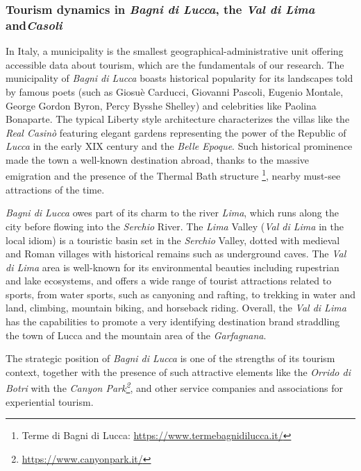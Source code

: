 \documentclass[sustainability,article,submit,pdftex,moreauthors]{Definitions/mdpi}
\begin{document}

\subsubsection{Tourism dynamics in \emph{Bagni di Lucca}, the \emph{Val di Lima} and\emph{Casoli}}

In Italy, a municipality is the smallest geographical-administrative unit offering accessible data about tourism, which are the fundamentals of our research. The municipality of \emph{Bagni di Lucca} boasts historical popularity for its landscapes told by famous poets (such as Giosuè Carducci, Giovanni Pascoli, Eugenio Montale, George Gordon Byron, Percy Bysshe Shelley) and celebrities like Paolina Bonaparte. The typical Liberty style architecture characterizes the villas like the \textit{Real Casinò} featuring elegant gardens representing the power of the Republic of \emph{Lucca} in the early XIX century and the \emph{Belle Epoque}. Such historical prominence made the town a well-known destination abroad, thanks to the massive emigration and the presence of the Thermal Bath structure \footnote{Terme di Bagni di Lucca: \url{https://www.termebagnidilucca.it/}}, nearby must-see attractions of the time.

\emph{Bagni di Lucca} owes part of its charm to the river \emph{Lima}, which runs along the city before flowing into the \textit{Serchio} River. The \emph{Lima} Valley (\emph {Val di Lima} in the local idiom) is a touristic basin set in the \textit{Serchio} Valley, dotted with medieval and Roman villages with historical remains such as underground caves. The \emph{Val di Lima} area is well-known for its environmental beauties including rupestrian and lake ecosystems, and offers a wide range of tourist attractions related to sports, from water sports, such as canyoning and rafting, to trekking in water and land, climbing, mountain biking, and horseback riding. Overall, the \emph{Val di Lima} has the capabilities to promote a very identifying destination brand straddling the town of Lucca and the mountain area of the \textit{Garfagnana}.

The strategic position of \emph{Bagni di Lucca} is one of the strengths of its tourism context, together with the presence of such attractive elements like the \emph{Orrido di Botri} with the \emph{Canyon Park\footnote{\url{ https://www.canyonpark.it/}}}, and other service companies and associations for experiential tourism.
\end{document}
